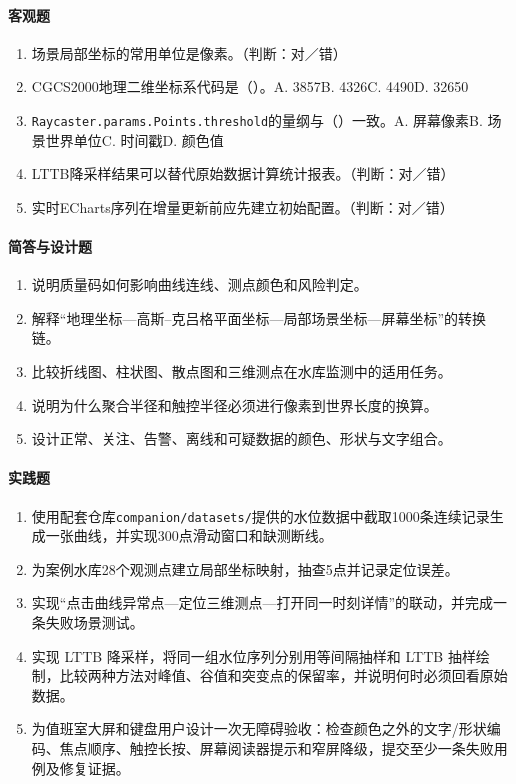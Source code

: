 \paragraph{客观题}
\begin{enumerate}
\item 场景局部坐标的常用单位是像素。（判断：对／错）
\item CGCS2000地理二维坐标系代码是（\quad）。A. 3857\quad B. 4326\quad C. 4490\quad D. 32650
\item \texttt{Raycaster.params.Points.threshold}的量纲与（\quad）一致。A. 屏幕像素\quad B. 场景世界单位\quad C. 时间戳\quad D. 颜色值
\item LTTB降采样结果可以替代原始数据计算统计报表。（判断：对／错）
\item 实时ECharts序列在增量更新前应先建立初始配置。（判断：对／错）

\end{enumerate}

\paragraph{简答与设计题}
\begin{enumerate}[resume]
\item 说明质量码如何影响曲线连线、测点颜色和风险判定。
\item 解释“地理坐标—高斯--克吕格平面坐标—局部场景坐标—屏幕坐标”的转换链。
\item 比较折线图、柱状图、散点图和三维测点在水库监测中的适用任务。
\item 说明为什么聚合半径和触控半径必须进行像素到世界长度的换算。
\item 设计正常、关注、告警、离线和可疑数据的颜色、形状与文字组合。

\end{enumerate}

\paragraph{实践题}
\begin{enumerate}[resume]
\item 使用配套仓库\texttt{companion/datasets/}提供的水位数据中截取1000条连续记录生成一张曲线，并实现300点滑动窗口和缺测断线。
\item 为案例水库28个观测点建立局部坐标映射，抽查5点并记录定位误差。
\item 实现“点击曲线异常点—定位三维测点—打开同一时刻详情”的联动，并完成一条失败场景测试。
\item 实现 LTTB 降采样，将同一组水位序列分别用等间隔抽样和 LTTB 抽样绘制，比较两种方法对峰值、谷值和突变点的保留率，并说明何时必须回看原始数据。
\item 为值班室大屏和键盘用户设计一次无障碍验收：检查颜色之外的文字/形状编码、焦点顺序、触控长按、屏幕阅读器提示和窄屏降级，提交至少一条失败用例及修复证据。
\end{enumerate}
